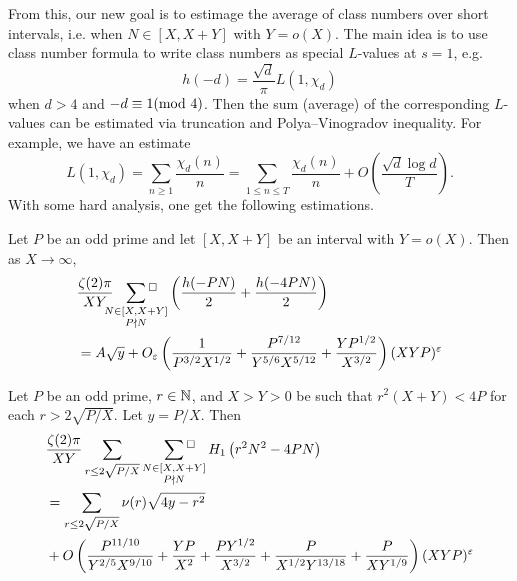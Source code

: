 From this, our new goal is to estimage the average of class numbers over short intervals, i.e. when $N \in [X, X + Y]$ with $Y = o(X)$.
The main idea is to use class number formula to write class numbers as special $L$-values at $s = 1$, e.g.
\[
h(-d) = \frac{\sqrt{d}}{\pi} L(1, \chi_d)
\]
when $d > 4$ and $-d \equiv 1 (\text{mod }4)$.
Then the sum (average) of the corresponding $L$-values can be estimated via truncation and Polya--Vinogradov inequality.
For example, we have an estimate
\[
L(1, \chi_d) = \sum_{n \ge 1} \frac{\chi_d(n)}{n} = \sum_{1 \le n \le T} \frac{\chi_d(n)}{n} + O\left(\frac{\sqrt{d} \log d}{T}\right).
\]
With some hard analysis, one get the following estimations.
\begin{proposition}
    Let $P$ be an odd prime and let $[X, X + Y]$ be an interval with $Y = o(X)$.
    Then as $X \to \infty$,
    \begin{align*}
        &\frac{\zeta(2) \pi}{XY} \sideset{}{{}^\square}\sum_{\substack{N \in [X, X + Y] \\ P \nmid N}}  \left(\frac{h(-PN)}{2} + \frac{h(-4PN)}{2} \right) \\
        &= A \sqrt{y} + O_{\varepsilon} \left(\frac{1}{P^{3/2}X^{1/2}} + \frac{P^{7/12}}{Y^{5/6} X^{5/12}} + \frac{YP^{1/2}}{X^{3/2}}\right) (XYP)^{\varepsilon}
    \end{align*}
\end{proposition}


\begin{proposition}
    Let $P$ be an odd prime, $r \in \mathbb{N}$, and $X > Y > 0$ be such that $r^2(X + Y) < 4 P$ for each $r > 2 \sqrt{P/X}$. Let $y = P/X$. Then
    \begin{align*}
        &\frac{\zeta(2) \pi}{ XY} \sum_{r \le 2 \sqrt{P/X}} \,\,\,\, \sideset{}{{}^\square}\sum_{\substack{N \in [X, X + Y] \\ P \nmid N}}  H_1\left(r^2 N^2 - 4 PN\right) \\
        &= \sum_{r \le 2 \sqrt{P/X}} \nu(r) \sqrt{4y - r^2} \\
        &+ O\left(\frac{P^{11/10}}{Y^{2/5}X^{9/10}} + \frac{YP}{X^2} + \frac{PY^{1/2}}{X^{3/2}} + \frac{P}{X^{1/2} Y^{13/18}} + \frac{P}{XY^{1/9}}\right) (XYP)^\varepsilon
    \end{align*}
\end{proposition}